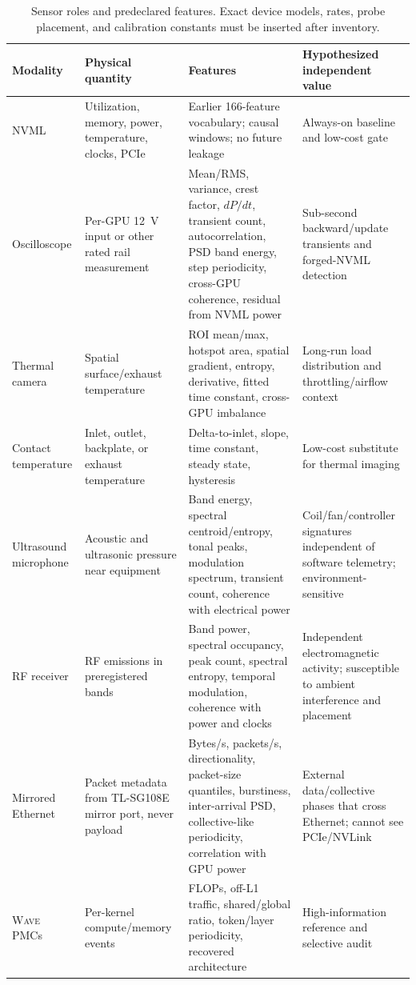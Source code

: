 \documentclass[sigplan,anonymous,review,nonacm]{acmart}
\newcommand{\wave}{\textsc{Wave}}
\begin{document}
\begin{table}[t]
\centering
\caption{Sensor roles and predeclared features. Exact device models, rates, probe placement, and calibration constants must be inserted after inventory.}
\label{tab:sensors}
\small
\begin{tabularx}{\textwidth}{p{1.7cm}p{2.2cm}Xp{3.2cm}}
\toprule
Modality & Physical quantity & Features & Hypothesized independent value \\
\midrule
NVML & Utilization, memory, power, temperature, clocks, PCIe & Earlier 166-feature vocabulary; causal windows; no future leakage & Always-on baseline and low-cost gate \\
Oscilloscope & Per-GPU 12~V input or other rated rail measurement & Mean/RMS, variance, crest factor, $dP/dt$, transient count, autocorrelation, PSD band energy, step periodicity, cross-GPU coherence, residual from NVML power & Sub-second backward/update transients and forged-NVML detection \\
Thermal camera & Spatial surface/exhaust temperature & ROI mean/max, hotspot area, spatial gradient, entropy, derivative, fitted time constant, cross-GPU imbalance & Long-run load distribution and throttling/airflow context \\
Contact temperature & Inlet, outlet, backplate, or exhaust temperature & Delta-to-inlet, slope, time constant, steady state, hysteresis & Low-cost substitute for thermal imaging \\
Ultrasound microphone & Acoustic and ultrasonic pressure near equipment & Band energy, spectral centroid/entropy, tonal peaks, modulation spectrum, transient count, coherence with electrical power & Coil/fan/controller signatures independent of software telemetry; environment-sensitive \\
RF receiver & RF emissions in preregistered bands & Band power, spectral occupancy, peak count, spectral entropy, temporal modulation, coherence with power and clocks & Independent electromagnetic activity; susceptible to ambient interference and placement \\
Mirrored Ethernet & Packet metadata from TL-SG108E mirror port, never payload & Bytes/s, packets/s, directionality, packet-size quantiles, burstiness, inter-arrival PSD, collective-like periodicity, correlation with GPU power & External data/collective phases that cross Ethernet; cannot see PCIe/NVLink \\
\wave{} PMCs & Per-kernel compute/memory events & FLOPs, off-L1 traffic, shared/global ratio, token/layer periodicity, recovered architecture & High-information reference and selective audit \\
\bottomrule
\end{tabularx}
\end{table}
\end{document}
